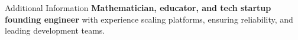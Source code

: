 \begin{rubric}{Additional Information}
\entry*[2019-2024] \textbf{Mathematician, educator, and tech startup founding engineer} with experience scaling platforms, ensuring reliability, and leading development teams.

\end{rubric}

